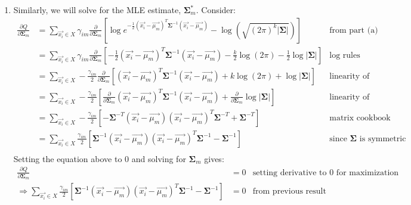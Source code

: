 \documentclass[11pt, fleqn]{article}
\newcommand{\pd}[2]{\frac{\partial #1}{\partial #2}}
\begin{document}
\begin{enumerate}
    \item Similarly, we will solve for the MLE estimate, $\boldsymbol{\Sigma}_m^*$. Consider:
    \begin{align*}
        \pd{Q}{\boldsymbol{\Sigma}_m} &= \sum_{\vec{x_i} \in X} \gamma_{im} \pd{}{\boldsymbol{\Sigma}_m} \left[ \log e^{-\frac{1}{2} (\vec{x_i} - \vec{\mu_m})^T \boldsymbol{\Sigma}^{-1} (\vec{x_i} - \vec{\mu_m})} - \log \left(\sqrt{(2\pi)^k \left|\boldsymbol{\Sigma}\right|}\right) \right] & \text{from part (a)} \\
        &= \sum_{\vec{x_i} \in X} \gamma_{im} \pd{}{\boldsymbol{\Sigma}_m} \left[ -\frac{1}{2} (\vec{x_i} - \vec{\mu_m})^T \boldsymbol{\Sigma}^{-1} (\vec{x_i} - \vec{\mu_m}) - \frac{k}{2}\log (2\pi) - \frac{1}{2} \log \left|\boldsymbol{\Sigma}\right| \right] & \text{log rules} \\
        &= \sum_{\vec{x_i} \in X} -\frac{\gamma_{im}}{2} \pd{}{\boldsymbol{\Sigma}_m} \left[ (\vec{x_i} - \vec{\mu_m})^T \boldsymbol{\Sigma}^{-1} (\vec{x_i} - \vec{\mu_m}) + k\log (2\pi) + \log \left|\boldsymbol{\Sigma}\right| \right] & \text{linearity of differentiation} \\
        &= \sum_{\vec{x_i} \in X} -\frac{\gamma_{im}}{2} \left[ \pd{}{\boldsymbol{\Sigma}_m} (\vec{x_i} - \vec{\mu_m})^T \boldsymbol{\Sigma}^{-1} (\vec{x_i} - \vec{\mu_m}) + \pd{}{\boldsymbol{\Sigma}_m} \log \left|\boldsymbol{\Sigma}\right| \right] & \text{linearity of differentiation} \\
        &= \sum_{\vec{x_i} \in X} -\frac{\gamma_{im}}{2} \left[ -\boldsymbol{\Sigma}^{-T} (\vec{x_i} - \vec{\mu_m})(\vec{x_i} - \vec{\mu_m})^T \boldsymbol{\Sigma}^{-T}  + \boldsymbol{\Sigma}^{-T} \right] & \text{matrix cookbook} \\
        &= \sum_{\vec{x_i} \in X} \frac{\gamma_{im}}{2} \left[ \boldsymbol{\Sigma}^{-1} (\vec{x_i} - \vec{\mu_m})(\vec{x_i} - \vec{\mu_m})^T \boldsymbol{\Sigma}^{-1}  - \boldsymbol{\Sigma}^{-1} \right] & \text{since } \boldsymbol{\Sigma} \text{ is symmetric} \\
    \end{align*}
    Setting the equation above to $0$ and solving for $\boldsymbol{\Sigma}_m$ gives:
    \begin{align*}
        \pd{Q}{\boldsymbol{\Sigma}_m} &= 0 & \text{setting derivative to } 0 \text{ for maximization} \\
        \Rightarrow \sum_{\vec{x_i} \in X} \frac{\gamma_{im}}{2} \left[ \boldsymbol{\Sigma}^{-1} (\vec{x_i} - \vec{\mu_m})(\vec{x_i} - \vec{\mu_m})^T \boldsymbol{\Sigma}^{-1}  - \boldsymbol{\Sigma}^{-1} \right] &= 0 & \text{from previous result} \\

\end{align*}
\end{enumerate}
\end{document}
